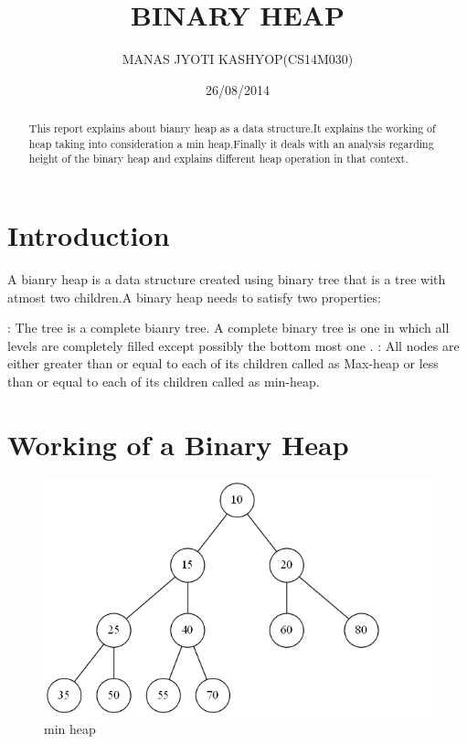 \documentclass{amsart}
\theoremstyle{plain}
\numberwithin{equation}{section}
\begin{document}
\title{BINARY HEAP}
\author{MANAS JYOTI KASHYOP(CS14M030)}
\address
{M.TECH 1ST YEAR. \newline DEPARTMENT OF CSE. \newline IIT MADRAS}%
%
\date{26/08/2014}

\begin{abstract}
This report explains about bianry heap as a data structure.It explains the working of heap taking into consideration a min heap.Finally it deals with an analysis regarding height of the binary heap and explains different heap operation in that context.
\end{abstract}
\maketitle


\section{Introduction}

\noindent A bianry heap is a data structure created using binary tree that is a tree with atmost two children.A binary heap needs to satisfy two properties:

: The tree is a complete bianry tree. A complete binary tree is one in which all levels are completely filled except possibly the bottom most one .\newline
{}: All nodes are either greater than or equal to each of its children called as Max-heap or less than or equal to each of its children called as min-heap.\newline
 
\section{Working of a Binary Heap}

\begin{figure}[h] \label{fig:png}
	\includegraphics[scale=0.5]{minheap.png} \hspace{0.5in}
	\caption{min heap}
	\end{figure}
\end{document}
